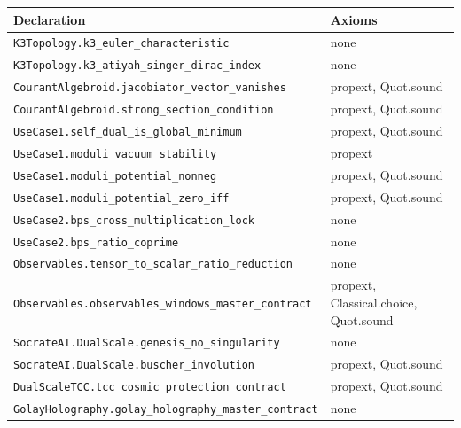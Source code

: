 \documentclass[11pt,a4paper]{article}
\theoremstyle{remark}
\begin{document}
\begin{center}
\footnotesize
\begin{tabular}{@{}>{\raggedright\arraybackslash}p{7.5cm} l@{}}
\toprule
\textbf{Declaration} & \textbf{Axioms} \\ \midrule
\texttt{K3Topology.\discretionary{}{}{}k3\_\discretionary{}{}{}euler\_\discretionary{}{}{}characteristic} & none \\
\texttt{K3Topology.\discretionary{}{}{}k3\_\discretionary{}{}{}atiyah\_\discretionary{}{}{}singer\_\discretionary{}{}{}dirac\_\discretionary{}{}{}index} & none \\
\texttt{CourantAlgebroid.\discretionary{}{}{}jacobiator\_\discretionary{}{}{}vector\_\discretionary{}{}{}vanishes} & propext, Quot.sound \\
\texttt{CourantAlgebroid.\discretionary{}{}{}strong\_\discretionary{}{}{}section\_\discretionary{}{}{}condition} & propext, Quot.sound \\
\texttt{UseCase1.\discretionary{}{}{}self\_\discretionary{}{}{}dual\_\discretionary{}{}{}is\_\discretionary{}{}{}global\_\discretionary{}{}{}minimum} & propext, Quot.sound \\
\texttt{UseCase1.\discretionary{}{}{}moduli\_\discretionary{}{}{}vacuum\_\discretionary{}{}{}stability} & propext \\
\texttt{UseCase1.\discretionary{}{}{}moduli\_\discretionary{}{}{}potential\_\discretionary{}{}{}nonneg} & propext, Quot.sound \\
\texttt{UseCase1.\discretionary{}{}{}moduli\_\discretionary{}{}{}potential\_\discretionary{}{}{}zero\_\discretionary{}{}{}iff} & propext, Quot.sound \\
\texttt{UseCase2.\discretionary{}{}{}bps\_\discretionary{}{}{}cross\_\discretionary{}{}{}multiplication\_\discretionary{}{}{}lock} & none \\
\texttt{UseCase2.\discretionary{}{}{}bps\_\discretionary{}{}{}ratio\_\discretionary{}{}{}coprime} & none \\
\texttt{Observables.\discretionary{}{}{}tensor\_\discretionary{}{}{}to\_\discretionary{}{}{}scalar\_\discretionary{}{}{}ratio\_\discretionary{}{}{}reduction} & none \\
\texttt{Observables.\discretionary{}{}{}observables\_\discretionary{}{}{}windows\_\discretionary{}{}{}master\_\discretionary{}{}{}contract} & propext, Classical.choice, Quot.sound \\
\texttt{SocrateAI.\discretionary{}{}{}DualScale.\discretionary{}{}{}genesis\_\discretionary{}{}{}no\_\discretionary{}{}{}singularity} & none \\
\texttt{SocrateAI.\discretionary{}{}{}DualScale.\discretionary{}{}{}buscher\_\discretionary{}{}{}involution} & propext, Quot.sound \\
\texttt{DualScaleTCC.\discretionary{}{}{}tcc\_\discretionary{}{}{}cosmic\_\discretionary{}{}{}protection\_\discretionary{}{}{}contract} & propext, Quot.sound \\
\texttt{GolayHolography.\discretionary{}{}{}golay\_\discretionary{}{}{}holography\_\discretionary{}{}{}master\_\discretionary{}{}{}contract} & none \\
\bottomrule
\end{tabular}
\end{center}
\end{document}
